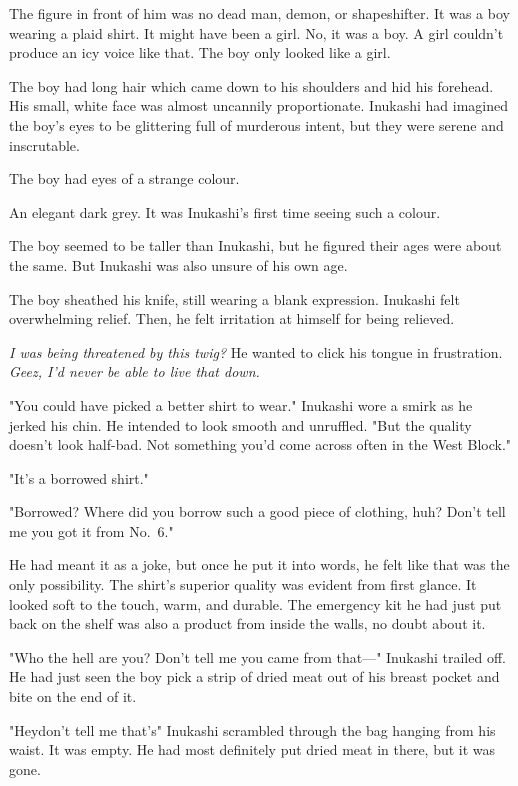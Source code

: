 The figure in front of him was no dead man, demon, or shapeshifter. It
was a boy wearing a plaid shirt. It might have been a girl. No, it was a
boy. A girl couldn't produce an icy voice like that. The boy only looked
like a girl.

The boy had long hair which came down to his shoulders and hid his
forehead. His small, white face was almost uncannily proportionate.
Inukashi had imagined the boy's eyes to be glittering full of murderous
intent, but they were serene and inscrutable.

The boy had eyes of a strange colour.

An elegant dark grey. It was Inukashi's first time seeing such a colour.

The boy seemed to be taller than Inukashi, but he figured their ages
were about the same. But Inukashi was also unsure of his own age.

The boy sheathed his knife, still wearing a blank expression. Inukashi
felt overwhelming relief. Then, he felt irritation at himself for being
relieved.

\emph{I was being threatened by this twig?} He wanted to click his tongue in
frustration. \emph{Geez, I'd never be able to live that down.}

"You could have picked a better shirt to wear." Inukashi wore a smirk as
he jerked his chin. He intended to look smooth and unruffled. "But the
quality doesn't look half-bad. Not something you'd come across often in
the West Block."

"It's a borrowed shirt."

"Borrowed? Where did you borrow such a good piece of clothing, huh?
Don't tell me you got it from No.~6."

He had meant it as a joke, but once he put it into words, he felt like
that was the only possibility. The shirt's superior quality was evident
from first glance. It looked soft to the touch, warm, and durable. The
emergency kit he had just put back on the shelf was also a product from
inside the walls, no doubt about it.

"Who the hell are you? Don't tell me you came from that---" Inukashi
trailed off. He had just seen the boy pick a strip of dried meat out of
his breast pocket and bite on the end of it.

"Hey\el don't tell me that's\el " Inukashi scrambled through the bag
hanging from his waist. It was empty. He had most definitely put dried
meat in there, but it was gone.

